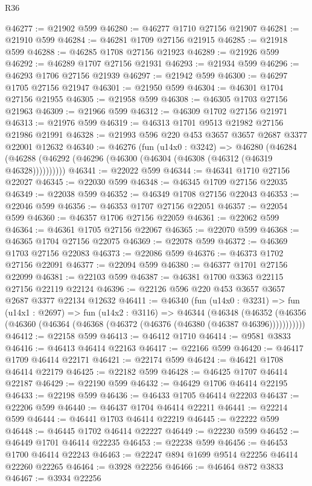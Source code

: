 \begin{lexlean}{R36}
\begin{coremodule}
@46277 := @21902 @599
@46280 := @46277 @1710 @27156 @21907
@46281 := @21910 @599
@46284 := @46281 @1709 @27156 @21915
@46285 := @21918 @599
@46288 := @46285 @1708 @27156 @21923
@46289 := @21926 @599
@46292 := @46289 @1707 @27156 @21931
@46293 := @21934 @599
@46296 := @46293 @1706 @27156 @21939
@46297 := @21942 @599
@46300 := @46297 @1705 @27156 @21947
@46301 := @21950 @599
@46304 := @46301 @1704 @27156 @21955
@46305 := @21958 @599
@46308 := @46305 @1703 @27156 @21963
@46309 := @21966 @599
@46312 := @46309 @1702 @27156 @21971
@46313 := @21976 @599
@46319 := @46313 @1701 @9513 @21982 @27156 @21986 @21991
@46328 := @21993 @596 @220 @453 @3657 @3657 @2687 @3377 @22001 @12632
@46340 := @46276
    (fun (u14x0 : @3242) =>
    @46280 (@46284 (@46288 (@46292 (@46296 (@46300 (@46304 (@46308 (@46312 (@46319 @46328))))))))))
@46341 := @22022 @599
@46344 := @46341 @1710 @27156 @22027
@46345 := @22030 @599
@46348 := @46345 @1709 @27156 @22035
@46349 := @22038 @599
@46352 := @46349 @1708 @27156 @22043
@46353 := @22046 @599
@46356 := @46353 @1707 @27156 @22051
@46357 := @22054 @599
@46360 := @46357 @1706 @27156 @22059
@46361 := @22062 @599
@46364 := @46361 @1705 @27156 @22067
@46365 := @22070 @599
@46368 := @46365 @1704 @27156 @22075
@46369 := @22078 @599
@46372 := @46369 @1703 @27156 @22083
@46373 := @22086 @599
@46376 := @46373 @1702 @27156 @22091
@46377 := @22094 @599
@46380 := @46377 @1701 @27156 @22099
@46381 := @22103 @599
@46387 := @46381 @1700 @3363 @22115 @27156 @22119 @22124
@46396 := @22126 @596 @220 @453 @3657 @3657 @2687 @3377 @22134 @12632
@46411 := @46340
    (fun (u14x0 : @3231) =>
    fun (u14x1 : @2697) =>
    fun (u14x2 : @3116) =>
    @46344
      (@46348
        (@46352 (@46356 (@46360 (@46364 (@46368 (@46372 (@46376 (@46380 (@46387 @46396)))))))))))
@46412 := @22158 @599
@46413 := @46412 @1710
@46414 := @9581 @3833
@46416 := @46413 @46414 @22163
@46417 := @22166 @599
@46420 := @46417 @1709 @46414 @22171
@46421 := @22174 @599
@46424 := @46421 @1708 @46414 @22179
@46425 := @22182 @599
@46428 := @46425 @1707 @46414 @22187
@46429 := @22190 @599
@46432 := @46429 @1706 @46414 @22195
@46433 := @22198 @599
@46436 := @46433 @1705 @46414 @22203
@46437 := @22206 @599
@46440 := @46437 @1704 @46414 @22211
@46441 := @22214 @599
@46444 := @46441 @1703 @46414 @22219
@46445 := @22222 @599
@46448 := @46445 @1702 @46414 @22227
@46449 := @22230 @599
@46452 := @46449 @1701 @46414 @22235
@46453 := @22238 @599
@46456 := @46453 @1700 @46414 @22243
@46463 := @22247 @894 @1699 @9514 @22256 @46414 @22260 @22265
@46464 := @3928 @22256
@46466 := @46464 @872 @3833
@46467 := @3934 @22256

\end{coremodule}
\end{lexlean}
